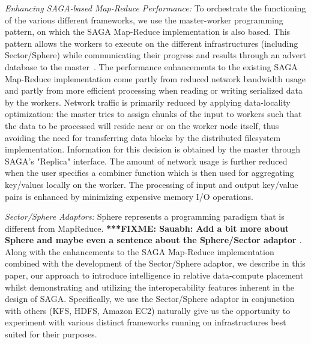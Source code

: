 \documentclass[a4paper,11pt]{article}
\newcommand{\fixme}[1]{ { \bf{ ***FIXME: #1 }} }
\newcommand{\fixme}[1]{}
\begin{document}
{\it Enhancing SAGA-based Map-Reduce Performance:} To orchestrate the functioning of the various different frameworks, we use the master-worker programming pattern, on which the SAGA Map-Reduce implementation is also based. This pattern allows the workers to execute on the different infrastructures (including Sector/Sphere) while communicating their progress and results through an advert database to the master~\cite{saga_data_intensive}. The performance enhancements to the existing SAGA Map-Reduce implementation come partly from reduced network bandwidth usage and partly from more efficient processing when reading or writing serialized data by the workers. Network traffic is primarily reduced by applying data-locality optimization: the master tries to assign chunks of the input to workers such that the data to be processed will reside near or on the worker node itself, thus avoiding the need for transferring data blocks by the distributed filesystem implementation. Information for this decision is obtained by the master through SAGA's "Replica" interface. The amount of network usage is further reduced when the user specifies a combiner function which is then used for aggregating key/values locally on the worker. The processing of input and output key/value pairs is enhanced by minimizing expensive memory I/O operations.

{\it Sector/Sphere Adaptors: }Sphere represents a programming paradigm that is different from MapReduce. \fixme{Sauabh: Add a bit more about Sphere and maybe even a sentence about the Sphere/Sector adaptor}.  Along with the enhancements to the SAGA Map-Reduce implementation combined with the development of the Sector/Sphere adaptor, we describe in this paper, our approach to introduce intelligence in relative data-compute placement whilst demonstrating and utilizing the interoperability features inherent in the design of SAGA. Specifically, we use the Sector/Sphere adaptor in conjunction with others (KFS, HDFS, Amazon EC2) naturally give us the opportunity to experiment with various distinct frameworks running on infrastructures best suited for their purposes.
\end{document}
